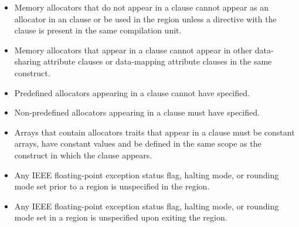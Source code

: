 \begin{itemize}
\item Memory allocators that do not appear in a  clause 
      cannot appear as an allocator in an  clause or be used in 
      the  region unless a  directive with the 
       clause is present in the same compilation unit.
\item Memory allocators that appear in a  clause cannot 
      appear in other data-sharing attribute clauses or data-mapping attribute 
      clauses in the same construct.
\item Predefined allocators appearing in a  clause cannot 
      have  specified.
\item Non-predefined allocators appearing in a  clause must 
      have  specified.
\item Arrays that contain allocators traits that appear in a  
      clause must be constant arrays, have constant values and be defined in the 
      same scope as the construct in which the clause appears. 
\item Any IEEE floating-point exception status flag, halting mode, or rounding mode 
      set prior to a  region is unspecified in the region.
\item Any IEEE floating-point exception status flag, halting mode, or rounding mode 
      set in a  region is unspecified upon exiting the region.





\end{itemize}
